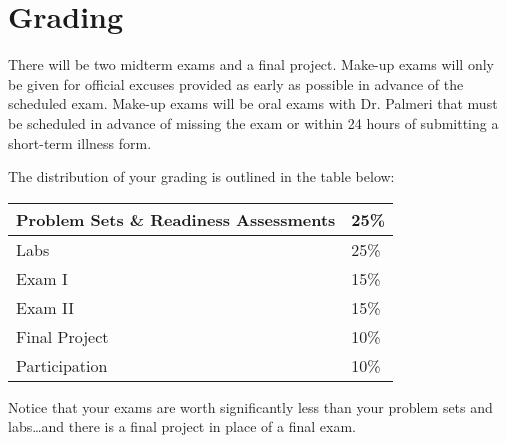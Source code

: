 \section{Grading}
There will be two midterm exams and a final project. Make-up exams will only be
given for official excuses provided as early as possible in advance of the
scheduled exam. Make-up exams will be oral exams with Dr. Palmeri that must be
scheduled in advance of missing the exam or within 24 hours of submitting a
short-term illness form.

The distribution of your grading is outlined in the table below:

\begin{center}
    \begin{tabular}{|l|l|} \hline
        Problem Sets \& Readiness Assessments & 25\% \\ \hline
        Labs & 25\% \\ \hline
        Exam I & 15\% \\ \hline
        Exam II & 15\% \\ \hline
        Final Project & 10\% \\ \hline
        Participation & 10\% \\ \hline
\end{tabular}
\end{center}

Notice that your exams are worth significantly less than your problem sets and
labs\ldots and there is a final project in place of a final exam.
